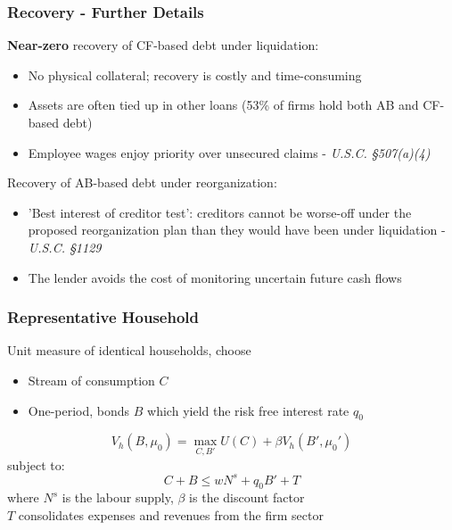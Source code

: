 \documentclass[aspectratio=169,xcolor=table]{beamer}
\begin{document}
\begin{frame}[label = payoffs_det] \frametitle{Recovery - Further Details \hfill  \hyperlink{payoffs}{}}

\textbf{Near-zero} recovery of CF-based debt under liquidation: 
\begin{itemize} \small
    \item No physical collateral; recovery is costly and time-consuming
    \item Assets are often tied up in other loans (53\% of firms hold both AB and CF-based debt)
    \item Employee wages enjoy priority over unsecured claims - \textit{U.S.C. §507(a)(4)}
\end{itemize} \normalsize \vspace{5mm}

Recovery of AB-based debt under reorganization: 
\begin{itemize} \small
    \item 'Best interest of creditor test': creditors cannot be worse-off under the proposed reorganization plan than they would have been under liquidation - \textit{U.S.C. §1129}
    \item The lender avoids the cost of monitoring uncertain future cash flows
\end{itemize} \normalsize
 \normalsize 


\end{frame}

\begin{frame}[label=Household] \frametitle{Representative Household \hfill \hyperlink{Model Summary}{}}

Unit measure of identical households, choose
\begin{itemize} \small
    \item Stream of consumption $C$ 
    \item One-period, bonds $B$ which yield the risk free interest rate $q_0$
\end{itemize} \normalsize

$$ V_h(B, \mu_0) = \max_{C,B'} U(C) + \beta V_h(B',\mu_0') $$
subject to: 
$$ C + B \leq w N^s + q_0 B' + T $$
where $N^s$ is the labour supply, $\beta$ is the discount factor \vspace{3mm} \\
$T$ consolidates expenses and revenues from the firm sector

\end{frame}
\end{document}
